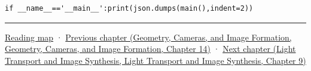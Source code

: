 \begin{verbatim}
if __name__=='__main__':print(json.dumps(main(),indent=2))
\end{verbatim}

\begin{center}\rule{0.5\linewidth}{0.5pt}\end{center}

\hyperref[volume-reading-map]{Reading map} · \href{../03-Geometry-Cameras-and-Image-Formation/main.pdf\#nameddest=04-visual-computing-ii-ch033-projection-scale-and-incidence-geometry}{Previous chapter (Geometry, Cameras, and Image Formation, Geometry, Cameras, and Image Formation, Chapter 14)} · \href{../04-Light-Transport-and-Image-Synthesis/main.pdf\#nameddest=04-visual-computing-ii-ch035-a-complete-renderer-as-an-executable-forward-model}{Next chapter (Light Transport and Image Synthesis, Light Transport and Image Synthesis, Chapter 9)}
